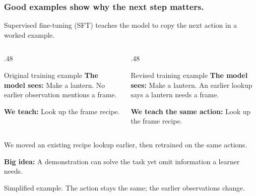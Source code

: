\documentclass[aspectratio=169,12pt]{beamer}
\newcommand{\aside}[1]{\vfill{\footnotesize\color{Gray}#1\par}}
\begin{document}
\begin{frame}[t]
\frametitle{Good examples show why the next step matters.}
Supervised fine-tuning (SFT) teaches the model to copy the next action in a worked example.
\begin{columns}[T,onlytextwidth]
\begin{column}{.48\textwidth}
\begin{block}{Original training example}
\small
\textbf{The model sees:} Make a lantern. No earlier observation mentions a frame.
\medskip

\textbf{We teach:} Look up the frame recipe.
\end{block}
\end{column}
\begin{column}{.48\textwidth}
\begin{block}{Revised training example}
\small
\textbf{The model sees:} Make a lantern. An earlier lookup says a lantern needs a frame.
\medskip

\textbf{We teach the same action:} Look up the frame recipe.
\end{block}
\end{column}
\end{columns}
\smallskip
We moved an existing recipe lookup earlier, then retrained on the same actions.
\smallskip

\textbf{Big idea:} A demonstration can solve the task yet omit information a learner needs.
\aside{Simplified example. The action stays the same; the earlier observations change.}
\end{frame}
\end{document}
